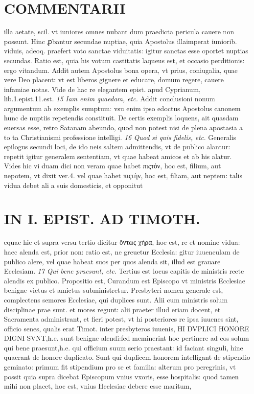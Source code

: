 \documentclass{article}
\begin{document}
\begin{pages}
\section*{COMMENTARII }
\marginpar{[ p.130 ]}\pstart illa aetate, scil. vt iuniores omnes nubant dum praedicta pericula cauere non possunt. Hinc ꝓbantur secundae nuptiae, quia Apostolus illaimperat iuniorib. viduis, adeoq. praefert voto sanctae viduitatis: igitur sanctas esse oportet nuptias secundas. Ratio est, quia his votum castitatis laqueus est, et occasio perditionis: ergo vitandum. Addit autem Apostolus bona opera, vt prius, coniugalia, quae vere Deo placent: vt est liberos gignere et educare, domum regere, cauere infamiae notas. Vide de hac re elegantem epist. apud Cyprianum, lib.1.epist.11.est.  \pend
\textit{15 Iam enim quaedam, etc. }\pstart Addit conclusioni nonum argumentum ab exemplis sumptum: vsu enim ipso edoctus Apostolus canonem hunc de nuptiis repetendis constituit. De certis exemplis loquens, ait quasdam euersas esse, retro Satanam abeundo, quod non potest nisi de plena apostasia a to ta Christianismi professione intelligi.  \pend
\textit{16 Quod si quis fidelis, etc. }\pstart Generalis epilogus secundi loci, de ido neis saltem admittendis, vt de publico alantur: repetit igitur generalem sententiam, vt quae habeat amicos et ab his alatur. Vides hic vi duam dici non veram quae habet πιςτόν, hoc est, filium, aut nepotem, vt dixit ver.4. vel quae habet πιςτὴν, hoc est, filiam, aut neptem: talis vidua debet ali a suis domesticis, et opponitut  \pend
\section*{IN I. EPIST. AD TIMOTH. }
\marginpar{[ p.131 ]}\pstart equae hic et supra versu tertio dicitur ὄντως χήρα, hoc est, re et nomine vidua: haec alenda est, prior non: ratio est, ne greuetur Ecclesia: gitur iuuenculam de publico alere, vel quae habeat suos per quos alenda sit, illud est grauare Ecclesiam.  \pend
\textit{17 Qui bene praesunt, etc. }\pstart Tertius est locus capitis de ministris recte alendis ex publico. Propositio est, Curandum est Episcopo vt ministris Ecclesiae benigne victus et amictus subministretur. Presbyteri nomen generale est, complectens semores Ecclesiae, qui duplices sunt.  \pend\pstart Alii cum ministris solum disciplinae prae sunt. et mores regunt: alii praeter illud eriam docent, et Sacramenta administrant, et fieri potest, vt hi posteriores re ipsa iuuenes sint, officio senes, qualis erat Timot. inter presbyteros iuuenis, HI DVPLICI HONORE DIGNI SVNT,h.e. sunt benigne alendi:fed meminerint hoc pertinere ad eos solum qui bene praesunt,h.e. qui officium suum serio praestant: id faciant singuli, hine quaerant de honore duplicato.  \pend\pstart Sunt qui duplicem honorem intelligant de stipendio geminato: primum fit stipendium pro se et familia: alterum pro peregrinis, vt possit quia supra dicebat Episcopum vnius vxoris, esse hospitalis: quod tamen mihi non placet, hoc est, vnius Heclesiae debere esse maritum,  \pend

\end{pages}
\end{document}
